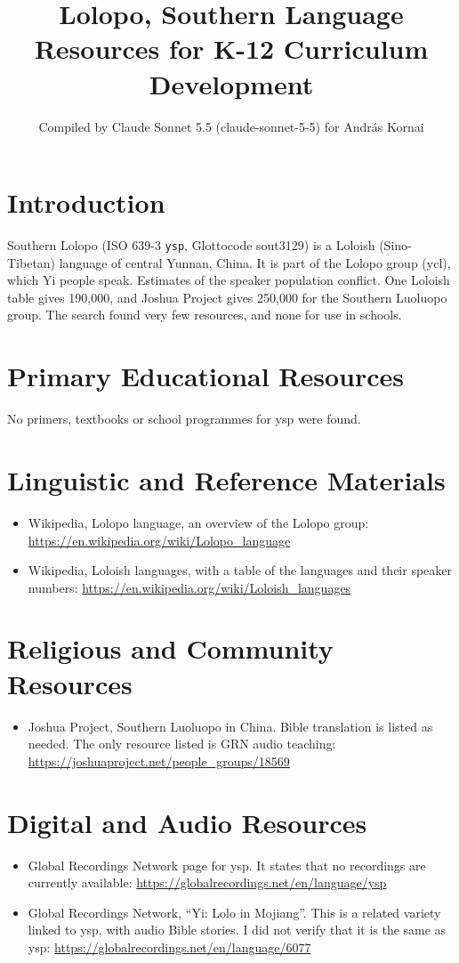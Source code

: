 \documentclass[12pt]{article}
\title{Lolopo, Southern Language Resources for K-12 Curriculum Development}
\author{Compiled by Claude Sonnet 5.5 (claude-sonnet-5-5) for Andr\'as Kornai}
\date{}
\begin{document}
\maketitle

\section{Introduction}
Southern Lolopo (ISO 639-3 \texttt{ysp}, Glottocode sout3129) is a Loloish (Sino-Tibetan) language of central Yunnan, China. It is part of the Lolopo group (ycl), which Yi people speak. Estimates of the speaker population conflict. One Loloish table gives 190,000, and Joshua Project gives 250,000 for the Southern Luoluopo group. The search found very few resources, and none for use in schools.

\section{Primary Educational Resources}
No primers, textbooks or school programmes for ysp were found.

\section{Linguistic and Reference Materials}
\begin{itemize}
\item Wikipedia, Lolopo language, an overview of the Lolopo group: \url{https://en.wikipedia.org/wiki/Lolopo_language}
\item Wikipedia, Loloish languages, with a table of the languages and their speaker numbers: \url{https://en.wikipedia.org/wiki/Loloish_languages}
\end{itemize}

\section{Religious and Community Resources}
\begin{itemize}
\item Joshua Project, Southern Luoluopo in China. Bible translation is listed as needed. The only resource listed is GRN audio teaching: \url{https://joshuaproject.net/people_groups/18569}
\end{itemize}

\section{Digital and Audio Resources}
\begin{itemize}
\item Global Recordings Network page for ysp. It states that no recordings are currently available: \url{https://globalrecordings.net/en/language/ysp}
\item Global Recordings Network, ``Yi: Lolo in Mojiang''. This is a related variety linked to ysp, with audio Bible stories. I did not verify that it is the same as ysp: \url{https://globalrecordings.net/en/language/6077}
\end{itemize}
\end{document}

